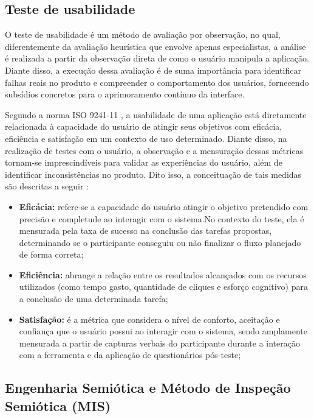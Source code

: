 \documentclass[12pt]{article}
\begin{document}
\begin{abstractp}
\subsection{Teste de usabilidade} \label{subsec:teste_usab}

O teste de usabilidade é um método de avaliação por observação, no qual, diferentemente da avaliação heurística que envolve apenas especialistas, a análise é realizada a partir da observação direta de como o usuário manipula a aplicação. Diante disso, a execução dessa avaliação é de suma importância para identificar falhas reais no produto e compreender o comportamento dos usuários, fornecendo subsídios concretos para o aprimoramento contínuo da interface. \cite{moran2019usability}


Segundo a norma ISO 9241-11 \cite{iso9241}, a usabilidade de uma aplicação está diretamente relacionada à capacidade do usuário de atingir seus objetivos com eficácia, eficiência e satisfação em um contexto de uso determinado. Diante disso, na realização de testes com o usuário, a observação e a mensuração dessas métricas tornam-se imprescindíveis para validar as experiências do usuário, além de identificar inconsistências no produto. Dito isso, a conceituação de tais medidas são descritas a seguir \cite{cybis2015ergonomia}: 
\begin{itemize}
    \item \textbf{Eficácia:} refere-se a capacidade do usuário atingir o objetivo pretendido com precisão e completude ao interagir com o sistema.No contexto do teste, ela é mensurada pela taxa de sucesso na conclusão das tarefas propostas, determinando se o participante conseguiu ou não finalizar o fluxo planejado de forma correta; 
    \item \textbf{Eficiência:} abrange a relação entre os resultados alcançados com os recursos utilizados (como tempo gasto, quantidade de cliques e esforço cognitivo) para a conclusão de uma determinada tarefa; 
   \item \textbf{Satisfação:} é a métrica que considera o nível de conforto, aceitação e confiança que o usuário possui ao interagir com o sistema, sendo amplamente mensurada a partir de capturas verbais do participante durante a interação com a ferramenta e da aplicação de questionários pós-teste;
\end{itemize}

\subsection{Engenharia Semiótica e Método de Inspeção Semiótica (MIS)} \label{subsec:eng_semiotica}


\end{abstractp}
\end{document}
